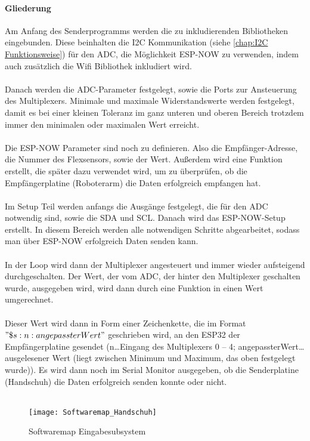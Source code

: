 \documentclass[titlepage,12pt,twoside]{article}
\begin{document}
\paragraph{Gliederung}
\hfill \break
\hfill \break
Am Anfang des Senderprogramms werden die zu inkludierenden Bibliotheken eingebunden. Diese beinhalten die I2C Kommunikation (siehe \autoref{chap:I2C Funktionsweise}) für 
den ADC, die Möglichkeit ESP-NOW zu verwenden, indem auch zusätzlich die Wifi Bibliothek inkludiert wird. \\
\\
Danach werden die ADC-Parameter festgelegt, sowie die Ports zur Ansteuerung des Multiplexers. Minimale und maximale 
Widerstandswerte werden festgelegt, damit es bei einer kleinen Toleranz im ganz unteren und oberen Bereich trotzdem immer den 
minimalen oder maximalen Wert erreicht. \\
\\
Die ESP-NOW Parameter sind noch zu definieren. Also die Empfänger-Adresse, die Nummer des Flexsensors, sowie der Wert. Außerdem 
wird eine Funktion erstellt, die später dazu verwendet wird, um zu überprüfen, ob die Empfängerplatine (Roboterarm) die Daten 
erfolgreich empfangen hat. \\
\\
Im Setup Teil werden anfangs die Ausgänge festgelegt, die für den ADC notwendig sind, sowie die SDA und SCL. Danach wird das 
ESP-NOW-Setup erstellt. In diesem Bereich werden alle notwendigen Schritte abgearbeitet, sodass man über ESP-NOW erfolgreich 
Daten senden kann. \\
\\
In der Loop wird dann der Multiplexer angesteuert und immer wieder aufsteigend durchgeschalten. Der Wert, der vom ADC, der
hinter den Multiplexer geschalten wurde, ausgegeben wird, wird dann durch eine Funktion in einen Wert umgerechnet. \\
\\
Dieser Wert wird dann in Form einer Zeichenkette, die im Format $"\$s:n:angepassterWert"$ geschrieben wird, an den ESP32 der 
Empfängerplatine gesendet (n…Eingang des Multiplexers 0 – 4; angepassterWert…ausgelesener Wert (liegt zwischen Minimum und 
Maximum, das oben festgelegt wurde)). Es wird dann noch im Serial Monitor ausgegeben, ob die Senderplatine (Handschuh) die 
Daten erfolgreich senden konnte oder nicht. \\
\\
\begin{figure}[H]
	\begin{center}
		\scalebox{1.2}
		{\texttt{[image: Softwaremap\_Handschuh]}}
		\caption{Softwaremap Eingabesubsystem}
		\label{fig:Softwaremap_Handschuh}			
	\end{center}
\end{figure}
\hfill \break
\end{document}
